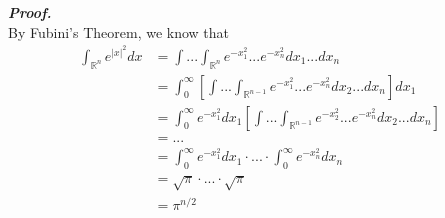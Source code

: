 \documentclass[a4paper,11pt]{article}
\begin{document}
\begin{enumerate}
 		\textit{\textbf {Proof.}}\\
 		By Fubini's Theorem, we know that
 		$$\begin{aligned}
 		\int_{\mathbb{R}^n} e^{|x|^2} dx
 		&= \int ... \int_{\mathbb{R}^n} e^{-x_1^2} ... e^{-x_n^2} dx_1...dx_n\\
 		&= \int_0^\infty \left[ \int ... \int_{\mathbb{R}^{n-1}} e^{-x_1^2} ... e^{-x_n^2} dx_2...dx_n \right] dx_1 \\
 		&= \int_0^\infty e^{-x_1^2} dx_1 \left[ \int ... \int_{\mathbb{R}^{n-1}} e^{-x_2^2} ... e^{-x_n^2} dx_2...dx_n \right]\\
 		&= ...\\
 		&= \int_0^\infty e^{-x_1^2} dx_1 \cdot ... \cdot \int_0^\infty e^{-x_n^2} dx_n\\
 		&= \sqrt{\pi} \cdot ... \cdot \sqrt{\pi}\\
 		&= \pi^{n/2}
 		\end{aligned}$$


 \end{enumerate}
\end{document}

